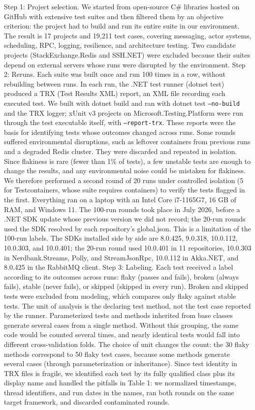 Step 1: Project selection. We started from open-source C\# libraries hosted on GitHub with extensive test suites and then filtered them by an objective criterion: the project had to build and run its entire suite in our environment. The result is 17 projects and 19,211 test cases, covering messaging, actor systems, scheduling, RPC, logging, resilience, and architecture testing. Two candidate projects (StackExchange.Redis and SSH.NET) were excluded because their suites depend on external servers whose runs were disrupted by the environment.
Step 2: Reruns. Each suite was built once and run 100 times in a row, without rebuilding between runs. In each run, the .NET test runner (dotnet test) produced a TRX (Test Results XML) report, an XML file recording each executed test. We built with dotnet build and ran with dotnet test \texttt{--no-build} and the TRX logger; xUnit v3 projects on Microsoft.Testing.Platform were run through the test executable itself, with \texttt{--report-trx}. These reports were the basis for identifying tests whose outcomes changed across runs. Some rounds suffered environmental disruptions, such as leftover containers from previous runs and a degraded Redis cluster. They were discarded and repeated in isolation. Since flakiness is rare (fewer than 1\% of tests), a few unstable tests are enough to change the results, and any environmental noise could be mistaken for flakiness. We therefore performed a second round of 20 runs under controlled isolation (5 for Testcontainers, whose suite requires containers) to verify the tests flagged in the first. Everything ran on a laptop with an Intel Core i7-1165G7, 16 GB of RAM, and Windows 11. The 100-run rounds took place in July 2026, before a .NET SDK update whose previous version we did not record; the 20-run rounds used the SDK resolved by each repository's global.json. This is a limitation of the 100-run labels. The SDKs installed side by side are 8.0.425, 9.0.318, 10.0.112, 10.0.303, and 10.0.401; the 20-run round used 10.0.401 in 11 repositories, 10.0.303 in Nerdbank.Streams, Polly, and StreamJsonRpc, 10.0.112 in Akka.NET, and 8.0.425 in the RabbitMQ client.
Step 3: Labeling. Each test received a label according to its outcomes across runs: flaky (passes and fails), broken (always fails), stable (never fails), or skipped (skipped in every run). Broken and skipped tests were excluded from modeling, which compares only flaky against stable tests. The unit of analysis is the declaring test method, not the test case reported by the runner. Parameterized tests and methods inherited from base classes generate several cases from a single method. Without this grouping, the same code would be counted several times, and nearly identical tests would fall into different cross-validation folds. The choice of unit changes the count: the 30 flaky methods correspond to 50 flaky test cases, because some methods generate several cases (through parameterization or inheritance). Since test identity in TRX files is fragile, we identified each test by its fully qualified class plus its display name and handled the pitfalls in Table 1: we normalized timestamps, thread identifiers, and run dates in the names, ran both rounds on the same target framework, and discarded contaminated rounds.

